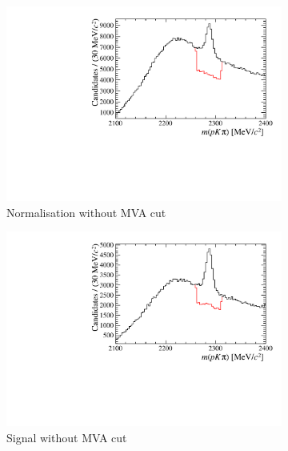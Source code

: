 \begin{figure}[!h]
    \centering
    \begin{subfigure}[t]{0.4\textwidth}
        \includegraphics[width=1.0\textwidth]{figs/Selection/B2DsD0_Ds2KKPi_Lc_Veto_NoBDT.pdf}
        \caption{Normalisation without MVA cut}
    \end{subfigure}%
    \begin{subfigure}[t]{0.4\textwidth}
        \includegraphics[width=1.0\textwidth]{figs/Selection/B2DsPhi_Ds2KKPi_Lc_Veto_NoBDT.pdf}
        \caption{Signal without MVA cut}
    \end{subfigure}\\
    \begin{subfigure}[t]{0.4\textwidth}

\end{subfigure}
\end{figure}
